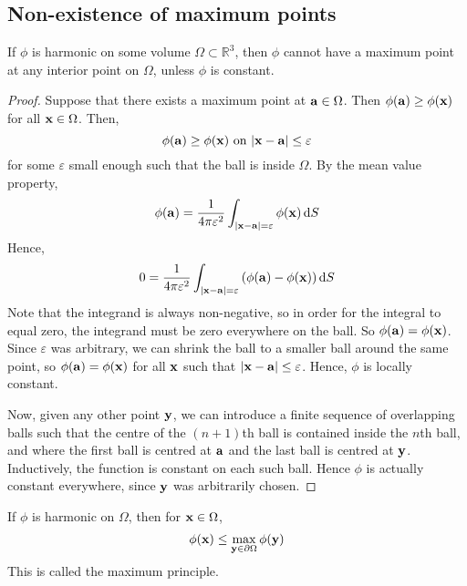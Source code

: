 \subsection{Non-existence of maximum points}
\begin{proposition}
	If \(\phi\) is harmonic on some volume \(\Omega \subset \mathbb R^3\), then \(\phi\) cannot have a maximum point at any interior point on \(\Omega\), unless \(\phi\) is constant.
\end{proposition}
\begin{proof}
	Suppose that there exists a maximum point at \(\vb a \in \Omega\).
	Then \(\phi(\vb a) \geq \phi(\vb x)\) for all \(\vb x \in \Omega\).
	Then,
	\[
		\phi(\vb a) \geq \phi(\vb x) \text{ on } \abs{\vb x - \vb a} \leq \varepsilon
	\]
	for some \(\varepsilon\) small enough such that the ball is inside \(\Omega\).
	By the mean value property,
	\[
		\phi(\vb a) = \frac{1}{4\pi \varepsilon^2} \int_{\abs{\vb x - \vb a} = \varepsilon} \phi(\vb x) \dd{S}
	\]
	Hence,
	\[
		0 = \frac{1}{4\pi \varepsilon^2} \int_{\abs{\vb x - \vb a} = \varepsilon} \left( \phi(\vb a) - \phi(\vb x) \right) \dd{S}
	\]
	Note that the integrand is always non-negative, so in order for the integral to equal zero, the integrand must be zero everywhere on the ball.
	So \(\phi(\vb a) = \phi(\vb x)\).
	Since \(\varepsilon\) was arbitrary, we can shrink the ball to a smaller ball around the same point, so \(\phi(\vb a) = \phi(\vb x)\) for all \(\vb x\) such that \(\abs{\vb x - \vb a} \leq \varepsilon\).
	Hence, \(\phi\) is locally constant.

	Now, given any other point \(\vb y\), we can introduce a finite sequence of overlapping balls such that the centre of the \((n+1)\)th ball is contained inside the \(n\)th ball, and where the first ball is centred at \(\vb a\) and the last ball is centred at \(\vb y\).
	Inductively, the function is constant on each such ball.
	Hence \(\phi\) is actually constant everywhere, since \(\vb y\) was arbitrarily chosen.
\end{proof}
\begin{corollary}
	If \(\phi\) is harmonic on \(\Omega\), then for \(\vb x \in \Omega\),
	\[
		\phi(\vb x) \leq \max_{\vb y \in \partial \Omega} \phi(\vb y)
	\]
	This is called the maximum principle.
\end{corollary}
